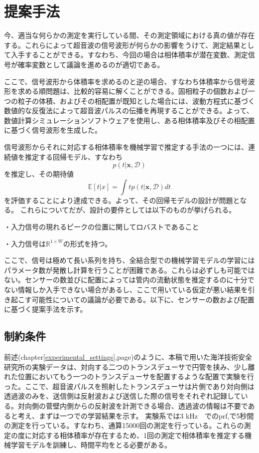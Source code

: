 \documentclass[uplatex]{suribt}
\begin{document}
\chapter{提案手法}
今、適当な何らかの測定を実行している間、その測定領域における真の値が存在する。これらによって超音波の信号波形が何らかの影響をうけて、測定結果として入手することができる。すなわち、今回の場合は相体積率が潜在変数、測定信号が確率変数として議論を進めるのが適切である。\par
ここで、信号波形から体積率を求めるのと逆の場合、すなわち体積率から信号波形を求める順問題は、比較的容易に解くことができる。固相粒子の個数および一つの粒子の体積、およびその相配置が既知とした場合には、波動方程式に基づく数値的な反復法によって超音波パルスの伝播を再現することができる。よって、数値計算シミュレーションソフトウェアを使用し、ある相体積率及びその相配置に基づく信号波形を生成した。\par
信号波形からそれに対応する相体積率を機械学習で推定する手法の一つには、連続値を推定する回帰モデル、すなわち
\begin{equation}
    p(t | \mathbf{x}, \mathcal{D})
\end{equation}
を推定し、その期待値
\begin{equation}
    \mathbb{E}[t | x ] = \int t p(t |\mathbf{x},\mathcal{D})dt 
\end{equation}
を評価することにより達成できる。よって、その回帰モデルの設計が問題となる。
これらについてだが、設計の要件としては以下のものが挙げられる。\par
・入力信号の現れるピークの位置に関してロバストであること\par
・入力信号は$\mathbb{R}^{1\times W}$の形式を持つ。\par
ここで、信号は極めて長い系列を持ち、全結合型での機械学習モデルの学習にはパラメータ数が発散し計算を行うことが困難である。これらは必ずしも可能ではない。センサーの数並びに配置によっては管内の流動状態を推定するのに十分でない情報しか入手できない場合があるし、ここで用いている仮定が悪い結果を引き起こす可能性についての議論が必要である。以下に、センサーの数および配置に基づく提案手法を示す。\par
\section{制約条件}
前述(chapter\ref{experimental_settings},page\pageref{experimental_settings})のように、本稿で用いた海洋技術安全研究所の実験データは、対向する二つのトランスデューサで円管を挟み、少し離れた位置においてもう一つのトランスデューサを配置するような配置で実験を行った。ここで、超音波パルスを照射したトランスデューサは片側であり対向側は透過波のみを、送信側は反射波および送信した際の信号をそれぞれ記録している。対向側の菅壁内側からの反射波を計測できる場合、透過波の情報は不要であると考え、まずは一つでの学習結果を示す。
実験系では3 kHz　でのprf,で5秒間の測定を行っている。すなわち、通算15000回の測定を行っている。これらの測定の度に対応する相体積率が存在するため、1回の測定で相体積率を推定する機械学習モデルを訓練し、時間平均をとる必要がある。
\end{document}
